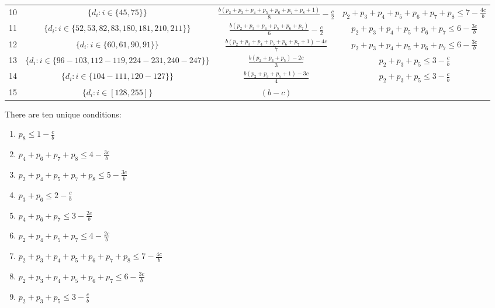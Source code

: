 \documentclass{article}
\theoremstyle{definition}
\begin{document}
\begin{table}[htbp]
{\begin{tabular}{r c c c}
   10 & $\{d_{i}:i \in \{45, 75\}\}$ & $\frac{b \left(p_{2} + p_{3} + p_{4} + p_{5} + p_{6} + p_{7} + p_{8} + 1\right)}{8} - \frac{c}{2}$ & $p_{2} + p_{3} + p_{4} + p_{5} + p_{6} + p_{7} + p_{8}\leq7 - \frac{4 c}{b}$ \\
   11 & $\{d_{i}:i \in \{52, 53, 82, 83, 180, 181, 210, 211\}\}$ & $\frac{b \left(p_{2} + p_{3} + p_{4} + p_{5} + p_{6} + p_{7}\right)}{6} - \frac{c}{2}$ & $p_{2} + p_{3} + p_{4} + p_{5} + p_{6} + p_{7}\leq6 - \frac{3 c}{b}$ \\
   12 & $\{d_{i}:i \in \{60, 61, 90, 91\}\}$ & $\frac{b \left(p_{2} + p_{3} + p_{4} + p_{5} + p_{6} + p_{7} + 1\right) - 4c}{7}$ & $p_{2} + p_{3} + p_{4} + p_{5} + p_{6} + p_{7}\leq6 - \frac{3 c}{b}$ \\
   13 & $\{d_{i}:i \in \{96\!- \!103, 112\!- \!119, 224\!- \!231, 240\!- \!247\}\}$ & $\frac{b \left(p_{2} + p_{3} + p_{5}\right) - 2 c}{3}$ & $p_{2} + p_{3} + p_{5}\leq3 - \frac{c}{b}$ \\
   14 & $\{d_{i}:i \in \{104\!-\!111, 120\!- \!127\}\}$ & $\frac{b \left(p_{2} + p_{3} + p_{5} + 1\right) - 3c}{4}$ & $p_{2} + p_{3} + p_{5}\leq3 - \frac{c}{b}$\\
   15 & $\{d_{i}:i \in [128, 255]\}$ & $(b - c)$ & \\
   \end{tabular}}
\end{table}

There are ten unique conditions:

\begin{enumerate}
  \item $p_8 \leq 1 \!- \!\frac{c}{b}$
  \item $p_4 + p_6 + p_7 + p_8 \leq 4 - \frac{3c}{b}$
  \item $p_{2} + p_{4} + p_{5} + p_{7} + p_{8} \leq 5 - \frac{3 c}{b}$
  \item $p_{3} + p_{6}\leq2 - \frac{c}{b}$
  \item $p_{4} + p_{6} + p_{7}\leq3 - \frac{2 c}{b}$
  \item $p_{2} + p_{4} + p_{5} + p_{7}\leq4 - \frac{2 c}{b}$
  \item $p_{2} + p_{3} + p_{4} + p_{5} + p_{6} + p_{7} + p_{8}\leq7 - \frac{4 c}{b}$
  \item $p_{2} + p_{3} + p_{4} + p_{5} + p_{6} + p_{7}\leq6 - \frac{3 c}{b}$
  \item $p_{2} + p_{3} + p_{5}\leq3 - \frac{c}{b}$
\end{enumerate}




\end{document}
